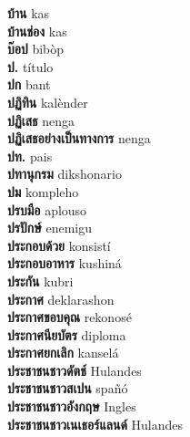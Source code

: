\textbf{ บ้าน  } kas \\
\textbf{ บ้านช่อง  } kas \\
\textbf{ บ๊อป  } bibòp \\
\textbf{ ป.  } título \\
\textbf{ ปก  } bant \\
\textbf{ ปฏิทิน  } kalènder \\
\textbf{ ปฏิเสธ  } nenga \\
\textbf{ ปฏิเสธอย่างเป็นทางการ  } nenga \\
\textbf{ ปท.  } pais \\
\textbf{ ปทานุกรม  } dikshonario \\
\textbf{ ปม  } kompleho \\
\textbf{ ปรบมือ  } aplouso \\
\textbf{ ปรปักษ์  } enemigu \\
\textbf{ ประกอบด้วย  } konsistí \\
\textbf{ ประกอบอาหาร  } kushiná \\
\textbf{ ประกัน  } kubri \\
\textbf{ ประกาศ  } deklarashon \\
\textbf{ ประกาศขอบคุณ  } rekonosé \\
\textbf{ ประกาศนียบัตร  } diploma \\
\textbf{ ประกาศยกเลิก  } kanselá \\
\textbf{ ประชาชนชาวดัตช์  } Hulandes \\
\textbf{ ประชาชนชาวสเปน  } spañó \\
\textbf{ ประชาชนชาวอังกฤษ  } Ingles \\
\textbf{ ประชาชนชาวเนเธอร์แลนด์  } Hulandes \\
